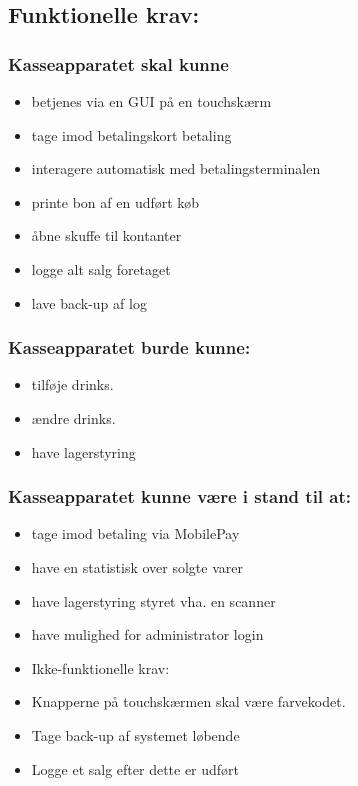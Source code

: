 \subsection{Funktionelle krav:}
\subsubsection*{Kasseapparatet skal kunne} 
\begin{itemize}
\item betjenes via en GUI på en touchskærm 
\item tage imod betalingskort betaling 
\item interagere automatisk med betalingsterminalen 
\item printe bon af en udført køb 
\item åbne skuffe til kontanter 
\item logge alt salg foretaget 
\item lave back-up af log 
\end{itemize}



\subsubsection*{Kasseapparatet burde kunne:}
\begin{itemize}
\item tilføje drinks. 
\item ændre drinks.
\item have lagerstyring
\end{itemize}

\subsubsection*{Kasseapparatet kunne være i stand til at:}
\begin{itemize}
\item tage imod betaling via MobilePay 
\item have en statistisk over solgte varer 
\item have lagerstyring styret vha. en scanner 
\item have mulighed for administrator login 
\end{itemize}

\begin{itemize}
\item Ikke-funktionelle krav:
\item Knapperne på touchskærmen skal være farvekodet.
\item Tage back-up af systemet løbende
\item Logge et salg efter dette er udført
\end{itemize}